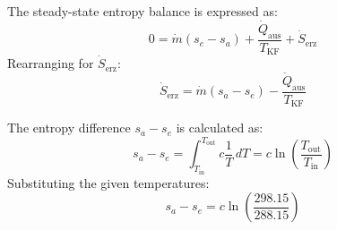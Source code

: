The steady-state entropy balance is expressed as:  
\[
0 = \dot{m} (s_e - s_a) + \frac{\dot{Q}_{\text{aus}}}{T_{\text{KF}}} + \dot{S}_{\text{erz}}
\]  
Rearranging for \( \dot{S}_{\text{erz}} \):  
\[
\dot{S}_{\text{erz}} = \dot{m} (s_a - s_e) - \frac{\dot{Q}_{\text{aus}}}{T_{\text{KF}}}
\]  

The entropy difference \( s_a - s_e \) is calculated as:  
\[
s_a - s_e = \int_{T_{\text{in}}}^{T_{\text{out}}} c \frac{1}{T} \, dT = c \ln \left( \frac{T_{\text{out}}}{T_{\text{in}}} \right)
\]  
Substituting the given temperatures:  
\[
s_a - s_e = c \ln \left( \frac{298.15}{288.15} \right)
\]